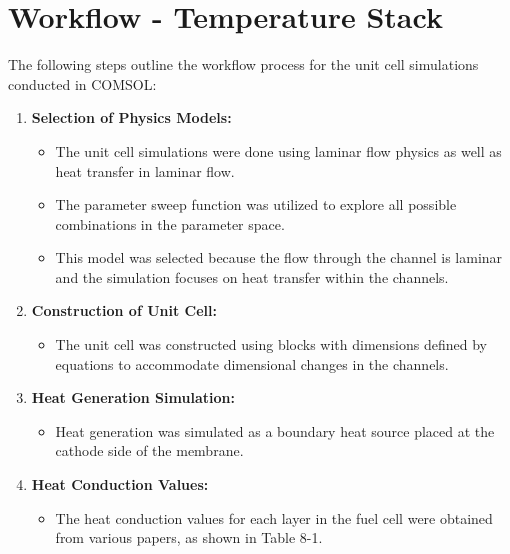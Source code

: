 \documentclass{report}
\begin{document}
        \section{Workflow - Temperature Stack}
        The following steps outline the workflow process for the unit cell simulations conducted in COMSOL:

        \begin{enumerate}
            \item \textbf{Selection of Physics Models:}
            \begin{itemize}
                \item The unit cell simulations were done using laminar flow physics as well as heat transfer in laminar flow.
                \item The parameter sweep function was utilized to explore all possible combinations in the parameter space.
                \item This model was selected because the flow through the channel is laminar and the simulation focuses on heat transfer within the channels.
            \end{itemize}
            
            \item \textbf{Construction of Unit Cell:}
            \begin{itemize}
                \item The unit cell was constructed using blocks with dimensions defined by equations to accommodate dimensional changes in the channels.
            \end{itemize}
            
            \item \textbf{Heat Generation Simulation:}
            \begin{itemize}
                \item Heat generation was simulated as a boundary heat source placed at the cathode side of the membrane.
            \end{itemize}
            
            \item \textbf{Heat Conduction Values:}
            \begin{itemize}
                \item The heat conduction values for each layer in the fuel cell were obtained from various papers, as shown in Table 8-1.
            \end{itemize}
            

\end{enumerate}
\end{document}
